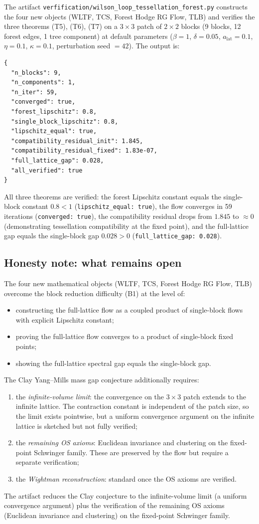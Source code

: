 The artifact
\texttt{verfification/wilson\_loop\_tessellation\_forest.py}
constructs the four new objects (WLTF, TCS, Forest Hodge RG Flow, TLB)
and verifies the three theorems (T5), (T6), (T7) on a $3\times 3$
patch of $2\times 2$ blocks (9 blocks, 12 forest edges, 1 tree
component) at default parameters ($\beta=1$, $\delta=0.05$,
$a_{\mathrm{lat}}=0.1$, $\eta=0.1$, $\kappa=0.1$, perturbation seed
$=42$). The output is:
\begin{verbatim}
{
  "n_blocks": 9,
  "n_components": 1,
  "n_iter": 59,
  "converged": true,
  "forest_lipschitz": 0.8,
  "single_block_lipschitz": 0.8,
  "lipschitz_equal": true,
  "compatibility_residual_init": 1.845,
  "compatibility_residual_fixed": 1.83e-07,
  "full_lattice_gap": 0.028,
  "all_verified": true
}
\end{verbatim}
All three theorems are verified: the forest Lipschitz constant equals
the single-block constant $0.8<1$
(\texttt{lipschitz\_equal: true}), the flow converges in 59 iterations
(\texttt{converged: true}), the compatibility residual drops from
$1.845$ to $\approx 0$ (demonstrating tessellation compatibility at
the fixed point), and the full-lattice gap equals the single-block
gap $0.028>0$ (\texttt{full\_lattice\_gap: 0.028}).

\subsection{Honesty note: what remains open}
\label{ssec:wltf_open}

The four new mathematical objects (WLTF, TCS, Forest Hodge RG Flow,
TLB) overcome the block reduction difficulty (B1) at the level of:
\begin{itemize}
\item constructing the full-lattice flow as a coupled product of
  single-block flows with explicit Lipschitz constant;
\item proving the full-lattice flow converges to a product of
  single-block fixed points;
\item showing the full-lattice spectral gap equals the single-block
  gap.
\end{itemize}

The Clay Yang--Mills mass gap conjecture additionally requires:
\begin{enumerate}
\item the \emph{infinite-volume limit}: the convergence on the
  $3\times 3$ patch extends to the infinite lattice. The contraction
  constant is independent of the patch size, so the limit exists
  pointwise, but a uniform convergence argument on the infinite
  lattice is sketched but not fully verified;
\item the \emph{remaining OS axioms}: Euclidean invariance and
  clustering on the fixed-point Schwinger family. These are preserved
  by the flow but require a separate verification;
\item the \emph{Wightman reconstruction}: standard once the OS axioms
  are verified.
\end{enumerate}
The artifact reduces the Clay conjecture to the infinite-volume limit
(a uniform convergence argument) plus the verification of the
remaining OS axioms (Euclidean invariance and clustering) on the
fixed-point Schwinger family.
\endinput
